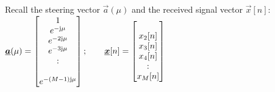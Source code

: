 Recall the steering vector $\vec{a}(\mu)$ and the received signal vector $\vec{x}[n]$:\\
$\underline{\boldsymbol {a}}(\mu)=\begin{bmatrix} 1\\e^{-\mathrm{j}\mu}\\e^{-2\mathrm{j}\mu}\\e^{-3\mathrm{j}\mu}\\:\\\\e^{-(M-1)\mathrm{j}\mu} \end{bmatrix}; \qquad \underline{\boldsymbol {x}}[n]=\begin{bmatrix} \\x_2[n]\\x_3[n]\\x_4[n]\\:\\x_M[n] \end{bmatrix}$\\


